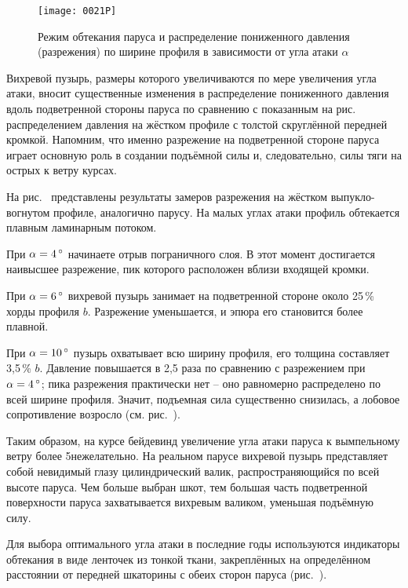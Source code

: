 \begin{figure*}[htb]
  \centering
  \texttt{[image: 0021P]}
  \caption{Режим обтекания паруса и распределение пониженного давления
    (разрежения) по ширине профиля в зависимости от угла атаки
    $\alpha$}
  \label{fig:21}
\end{figure*}

Вихревой пузырь, размеры которого увеличиваются по мере увеличения угла атаки, вносит существенные изменения в распределение пониженного давления вдоль подветренной стороны паруса по сравнению с показанным на рис.~ распределением давления на жёстком профиле с толстой скруглённой передней кромкой. Напомним, что именно разрежение на подветренной стороне паруса играет основную роль в создании подъёмной силы и, следовательно, силы тяги на острых к ветру курсах. 

На рис.~ представлены результаты замеров разрежения на жёстком выпукло-вогнутом профиле, аналогично парусу. На малых углах атаки профиль обтекается плавным ламинарным потоком. 

При $\alpha = 4\,^\circ$ начинаете отрыв пограничного слоя. В этот момент достигается наивысшее разрежение, пик которого расположен вблизи входящей кромки.
 
При $\alpha = 6\,^\circ$ вихревой пузырь занимает на подветренной стороне около 25\,\% хорды профиля $b$. Разрежение уменьшается, и эпюра его становится более плавной. 

При $\alpha = 10\,^\circ$ пузырь охватывает всю ширину профиля, его толщина составляет 3,5\,\% $b$. Давление повышается в 2,5 раза по сравнению с разрежением при $\alpha = 4\,^\circ$; пика разрежения практически нет \--- оно равномерно распределено по всей ширине профиля. Значит, подъемная сила существенно снизилась, а лобовое сопротивление возросло (см. рис.~). 

Таким образом, на курсе бейдевинд увеличение угла атаки паруса к вымпельному ветру более 5\gr нежелательно. На реальном парусе вихревой пузырь представляет собой невидимый глазу цилиндрический валик, распространяющийся по всей высоте паруса. Чем больше выбран шкот, тем большая часть подветренной поверхности паруса захватывается вихревым валиком, уменьшая подъёмную силу. 

Для выбора оптимального угла атаки в последние годы используются индикаторы обтекания в виде ленточек из тонкой ткани, закреплённых на определённом расстоянии от передней шкаторины с обеих сторон паруса (рис.~).

